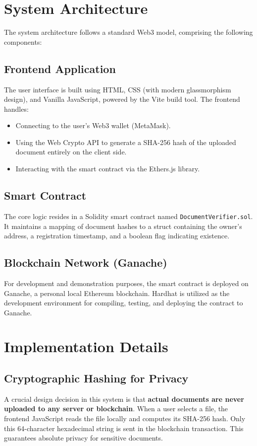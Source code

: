 \documentclass[12pt, a4paper]{article}
\begin{document}
\section{System Architecture}
The system architecture follows a standard Web3 model, comprising the following components:

\subsection{Frontend Application}
The user interface is built using HTML, CSS (with modern glassmorphism design), and Vanilla JavaScript, powered by the Vite build tool. The frontend handles:
\begin{itemize}
    \item Connecting to the user's Web3 wallet (MetaMask).
    \item Using the Web Crypto API to generate a SHA-256 hash of the uploaded document entirely on the client side.
    \item Interacting with the smart contract via the Ethers.js library.
\end{itemize}

\subsection{Smart Contract}
The core logic resides in a Solidity smart contract named \texttt{DocumentVerifier.sol}. It maintains a mapping of document hashes to a struct containing the owner's address, a registration timestamp, and a boolean flag indicating existence. 

\subsection{Blockchain Network (Ganache)}
For development and demonstration purposes, the smart contract is deployed on Ganache, a personal local Ethereum blockchain. Hardhat is utilized as the development environment for compiling, testing, and deploying the contract to Ganache.

\section{Implementation Details}

\subsection{Cryptographic Hashing for Privacy}
A crucial design decision in this system is that \textbf{actual documents are never uploaded to any server or blockchain}. When a user selects a file, the frontend JavaScript reads the file locally and computes its SHA-256 hash. Only this 64-character hexadecimal string is sent in the blockchain transaction. This guarantees absolute privacy for sensitive documents.
\end{document}
